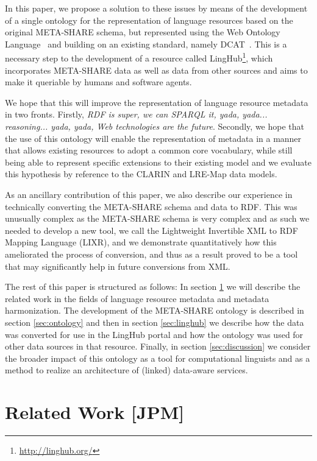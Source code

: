 \documentclass{llncs}
\begin{document}
In this paper, we propose a solution to these issues by means of the development
of a single ontology for the representation of language resources based on the
original META-SHARE schema, but represented using the Web Ontology
Language~\cite{motik2012owl} and building on an existing standard, namely
DCAT~\cite{maali2014data}. This is a necessary step to the development of a
resource called LingHub\footnote{\url{http://linghub.org/}}, which incorporates
META-SHARE data as well as data from other sources and aims to make it queriable
by humans and software agents.

We hope that this will improve the representation
of language resource metadata in two fronts. Firstly, \textit{RDF is super, we
    can SPARQL it, yada, yada... reasoning... yada, yada, Web technologies are
the future}. Secondly, we hope that the use of this ontology will enable the
representation of metadata in a manner that allows existing resources to adopt a
common core vocabulary, while still being able to represent specific extensions
to their existing model and we evaluate this hypothesis by reference to the
CLARIN and LRE-Map data models.

As an ancillary contribution of this paper, we also describe our experience in
technically converting the META-SHARE schema and data to RDF. This was unusually
complex as the META-SHARE schema is very complex and as such we needed to
develop a new tool, we call the Lightweight Invertible XML to RDF Mapping
Language (LIXR), and we demonstrate quantitatively how this ameliorated the
process of conversion, and thus as a result proved to be a tool that may
significantly help in future conversions from XML.

The rest of this paper is structured as follows: In section
\ref{sec:relatedwork} we will describe the related work in the fields of
language resource metadata and metadata harmonization. The development of the
META-SHARE ontology is described in section \ref{sec:ontology} and then in
section \ref{sec:linghub} we describe how the data was converted for use in the
LingHub portal and how the ontology was used for other data sources in that
resource. Finally, in section \ref{sec:discussion} we consider the broader
impact of this ontology as a tool for computational linguists and as a method to
realize an architecture of (linked) data-aware services.

\section{Related Work [JPM]}
\label{sec:relatedwork}
\end{document}
